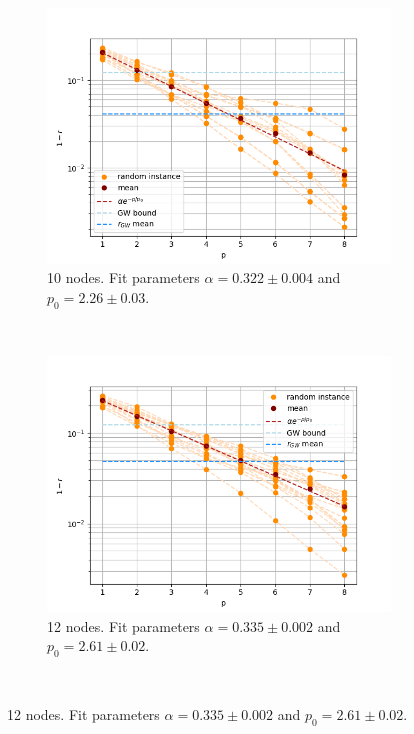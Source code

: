 \begin{figure}[H]
	\centering
	\begin{subfigure}[t]{0.45\textwidth}
		\centering
		\includegraphics[width=\textwidth]{figures/interp/FOM_(unweighted)/EXP/FOM_3-regular-10-nodal_exp}
		\caption{10 nodes. Fit parameters $\alpha = 0.322 \pm 0.004$ and $p_0 = 2.26 \pm 0.03$.}
	\end{subfigure}
	~
	\begin{subfigure}[t]{0.45\textwidth}
		\centering
		\includegraphics[width=\textwidth]{figures/interp/FOM_(unweighted)/EXP/FOM_3-regular-12-nodal_exp}
		\caption{12 nodes. Fit parameters $\alpha = 0.335 \pm 0.002$ and $p_0 = 2.61 \pm 0.02$.}
	\end{subfigure}
	\\

\end{figure}
